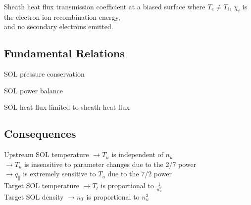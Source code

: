 \noindent
Sheath heat flux transmission coefficient at a biased surface 
\indent where $T_e\neq T_i$, $\chi_i$ is the electron-ion recombination energy,\\
\indent and no secondary electrons emitted.\\



\subsection{Fundamental Relations}
\noindent
SOL pressure conservation 

\noindent
SOL power balance 

\noindent
SOL heat flux limited to sheath heat flux  

\subsection{Consequences}
\noindent
Upstream SOL temperature 
\indent
$\rightarrow T_u$ is independent of $n_u$\\
\indent
$\rightarrow T_u$ is insensitive to parameter changes due to the 2/7 power\\
\indent
$\rightarrow q_\parallel$ is extremely sensitive to $T_u$ due to the 7/2 power\\

\noindent
Target SOL temperature 
\indent
$\rightarrow T_t$ is proportional to $\frac{1}{n_u^2}$\\

\noindent
Target SOL density 
\indent
$\rightarrow n_T$ is proportional to $n_u^3$
